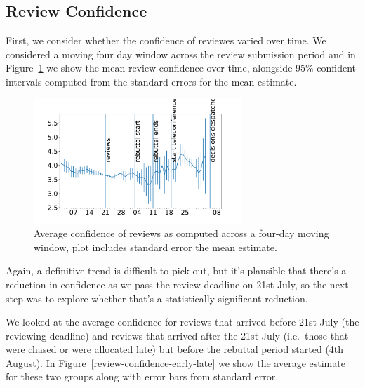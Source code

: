 \subsection{Review Confidence}\label{review-confidence}

First, we consider whether the confidence of reviewes varied over time. We considered a moving four day window across the review submission period and in Figure~\ref{review-confidence-time} we show the mean review confidence over time, alongside 95\% confident intervals computed from the standard errors for the mean estimate. 

\begin{figure}[htb]
\centering
\includegraphics[width=0.70\textwidth]{diagrams/neurips/review-confidence-time.pdf}


\caption{Average confidence of reviews as computed across a four-day moving window, plot includes standard error the mean estimate.}
\label{review-confidence-time}
\end{figure}

Again, a definitive trend is difficult to pick out, but it's plausible that there's a reduction in confidence as we pass the review deadline on 21st July, so the next step was to explore whether that's a statistically significant reduction.

We looked at the average confidence for
reviews that arrived before 21st July (the reviewing deadline) and
reviews that arrived after the 21st July (i.e.~those that were chased or
were allocated late) but before the rebuttal period started (4th
August). In Figure~\ref{review-confidence-early-late} we show the average estimate for these two groups along with error bars from standard error.

